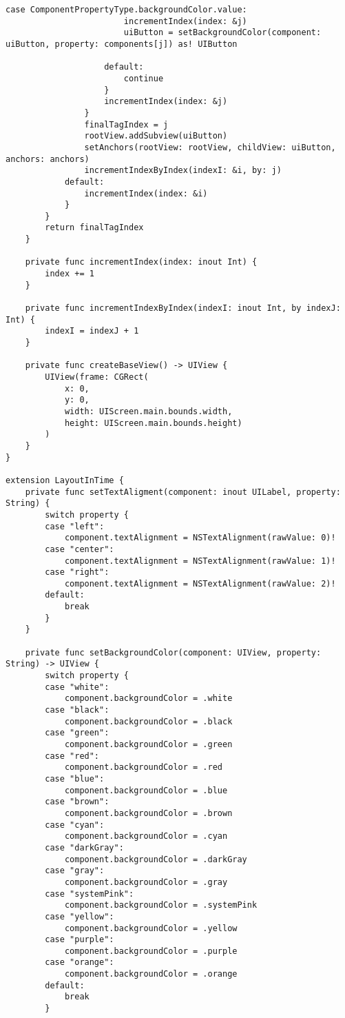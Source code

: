 \begin{lstlisting}[caption={Функция определения списка событий, по свершению которых происходит перезагрузка}]
                    case ComponentPropertyType.backgroundColor.value:
                        incrementIndex(index: &j)
                        uiButton = setBackgroundColor(component: uiButton, property: components[j]) as! UIButton

                    default:
                        continue
                    }
                    incrementIndex(index: &j)
                }
                finalTagIndex = j
                rootView.addSubview(uiButton)
                setAnchors(rootView: rootView, childView: uiButton, anchors: anchors)
                incrementIndexByIndex(indexI: &i, by: j)
            default:
                incrementIndex(index: &i)
            }
        }
        return finalTagIndex
    }

    private func incrementIndex(index: inout Int) {
        index += 1
    }

    private func incrementIndexByIndex(indexI: inout Int, by indexJ: Int) {
        indexI = indexJ + 1
    }

    private func createBaseView() -> UIView {
        UIView(frame: CGRect(
            x: 0,
            y: 0,
            width: UIScreen.main.bounds.width,
            height: UIScreen.main.bounds.height)
        )
    }
}

extension LayoutInTime {
    private func setTextAligment(component: inout UILabel, property: String) {
        switch property {
        case "left":
            component.textAlignment = NSTextAlignment(rawValue: 0)!
        case "center":
            component.textAlignment = NSTextAlignment(rawValue: 1)!
        case "right":
            component.textAlignment = NSTextAlignment(rawValue: 2)!
        default:
            break
        }
    }

    private func setBackgroundColor(component: UIView, property: String) -> UIView {
        switch property {
        case "white":
            component.backgroundColor = .white
        case "black":
            component.backgroundColor = .black
        case "green":
            component.backgroundColor = .green
        case "red":
            component.backgroundColor = .red
        case "blue":
            component.backgroundColor = .blue
        case "brown":
            component.backgroundColor = .brown
        case "cyan":
            component.backgroundColor = .cyan
        case "darkGray":
            component.backgroundColor = .darkGray
        case "gray":
            component.backgroundColor = .gray
        case "systemPink":
            component.backgroundColor = .systemPink
        case "yellow":
            component.backgroundColor = .yellow
        case "purple":
            component.backgroundColor = .purple
        case "orange":
            component.backgroundColor = .orange
        default:
            break
        }


\end{lstlisting}
